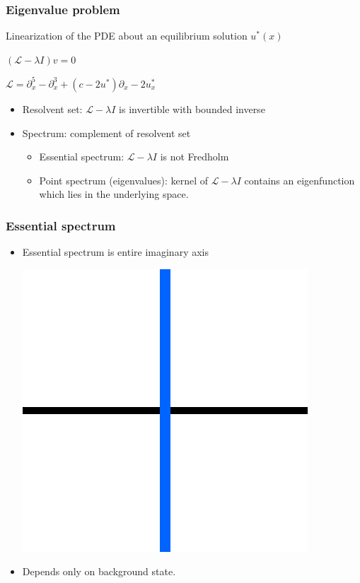 \documentclass[16pt]{beamer}
\begin{document}
\begin{frame}
	\frametitle{Eigenvalue problem}
	Linearization of the PDE about an equilibrium solution $u^*(x)$

	\begin{center}
		$(\mathcal{L} - \lambda I )v = 0$
	\end{center}

	\begin{center}
		$\mathcal{L} = \partial_x^5 - \partial_x^3 + (c - 2 u^*)\partial_x - 2 u^*_x $
	\end{center}

	\begin{itemize}
		\item Resolvent set: $\mathcal{L} - \lambda I$ is invertible with bounded inverse
		\vspace{0.5cm}
		\item Spectrum: complement of resolvent set
		\begin{itemize}
		\item Essential spectrum: $\mathcal{L} - \lambda I$ is not Fredholm
		\vspace{0.25cm}
		\item Point spectrum (eigenvalues): kernel of $\mathcal{L} - \lambda I$ contains an 	eigenfunction which lies in the underlying space.
		\end{itemize}
	\end{itemize}
\end{frame}


\begin{frame}
	\frametitle{Essential spectrum}
	\begin{itemize}
		\item Essential spectrum is entire imaginary axis
		\vspace{0.5cm}
			\begin{center}
			\includegraphics[width=0.3\linewidth]{images/essspec1.eps}
			\end{center}
		\vspace{0.5cm}
		\item Depends only on background state.
	\end{itemize}
\end{frame}
\end{document}
